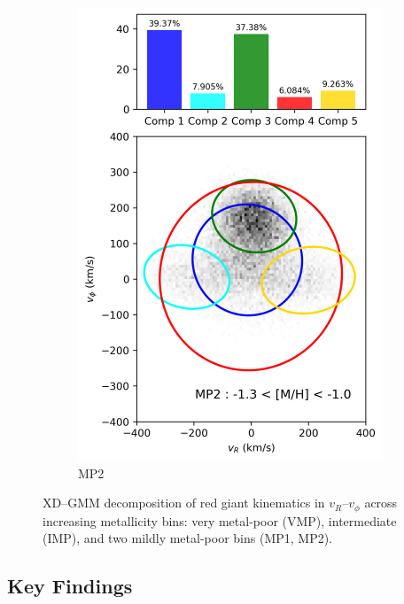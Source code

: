 \documentclass[a4paper,10pt]{article}
\begin{document}
\begin{multicols}{2}
\begin{figure}[H]
\begin{subfigure}[t]{0.24\linewidth}
    \includegraphics[width=\linewidth]{../figures/gmm_MP2.png}
    \caption{MP2}
    \label{fig:gmm_mp2}
  \end{subfigure}

  \caption{XD–GMM decomposition of red giant kinematics in $v_R$–$v_\phi$ across increasing metallicity bins: very metal-poor (VMP), intermediate (IMP), and two mildly metal-poor bins (MP1, MP2).}
  \label{fig:gmm_zhang}
\end{figure}

\subsection*{Key Findings}


\end{multicols}
\end{document}
